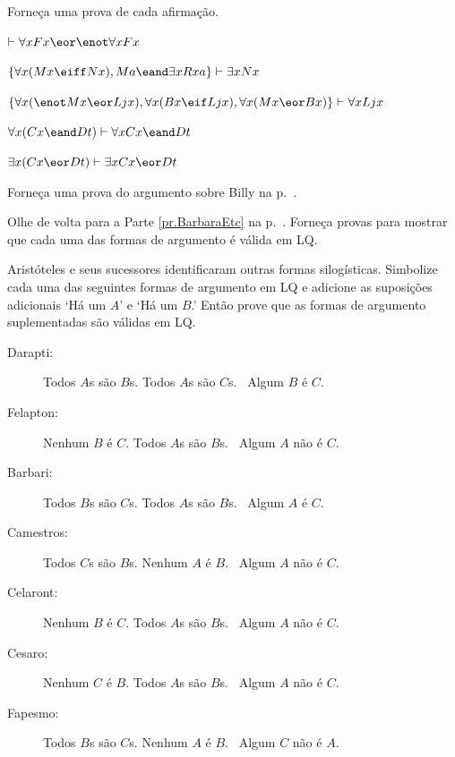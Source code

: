 \solutions
\problempart
\label{pr.someQLproofs}
Forneça uma prova de cada afirmação.
\begin{earg}
\item $\vdash \forall x Fx \eor \enot \forall x Fx$
\item $\{\forall x(Mx \eiff Nx), Ma\eand\exists x Rxa\}\vdash \exists x Nx$
\item $\{\forall x(\enot Mx \eor Ljx), \forall x(Bx\eif Ljx), \forall x(Mx\eor Bx)\}\vdash \forall xLjx$
\item $\forall x(Cx \eand Dt)\vdash \forall xCx \eand Dt$
\item $\exists x(Cx \eor Dt)\vdash \exists x Cx \eor Dt$
\end{earg}

\problempart
Forneça uma prova do argumento sobre Billy na p.~\pageref{surgeon2}.



\problempart
\label{pr.BarbaraEtc.proof1}
Olhe de volta para a Parte \ref{pr.BarbaraEtc} na p.~\pageref{pr.BarbaraEtc}. Forneça provas para mostrar que cada uma das formas de argumento é válida em LQ.



\problempart
\label{pr.BarbaraEtc.proof2}
Aristóteles e seus sucessores identificaram outras formas silogísticas. Simbolize cada uma das seguintes formas de argumento em LQ e adicione as suposições adicionais `Há um $A$' e `Há um $B$.' Então prove que as formas de argumento suplementadas são válidas em LQ.

\begin{description}
\item[Darapti:] Todos $A$s são $B$s. Todos $A$s são $C$s.
	\therefore\  Algum $B$ é $C$.
\item[Felapton:] Nenhum $B$ é $C$. Todos $A$s são $B$s.
	\therefore\  Algum $A$ não é $C$.
\item[Barbari:] Todos $B$s são $C$s. Todos $A$s são $B$s.
	\therefore\  Algum $A$ é $C$.
\item[Camestros:] Todos $C$s são $B$s. Nenhum $A$ é $B$.
	\therefore\  Algum $A$ não é $C$.
\item[Celaront:] Nenhum $B$ é $C$. Todos $A$s são $B$s.
	\therefore\  Algum $A$ não é $C$.
\item[Cesaro:] Nenhum $C$ é $B$. Todos $A$s são $B$s.
	\therefore\  Algum $A$ não é $C$.
\item[Fapesmo:] Todos $B$s são $C$s. Nenhum $A$ é $B$.
	\therefore\  Algum $C$ não é $A$.
\end{description}



